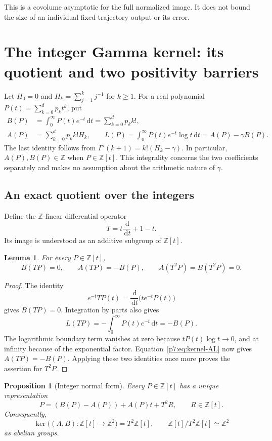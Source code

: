 \documentclass[11pt,a4paper]{article}
\newtheorem{lemma}[theorem]{Lemma}
\newtheorem{proposition}[theorem]{Proposition}
\theoremstyle{definition}
\theoremstyle{remark}
\newcommand{\Z}{\mathbb Z}
\newcommand{\dd}{\,\mathrm d}
\numberwithin{equation}{section}
\begin{document}
This is a covolume asymptotic for the full normalized image. It does not
bound the size of an individual fixed-trajectory output or its error.



\section{The integer Gamma kernel: its quotient and two positivity barriers}
\label{p7:sec:kernel}

Let $H_0=0$ and $H_k=\sum_{j=1}^k j^{-1}$ for $k\geq1$.
For a real polynomial $P(t)=\sum_{k=0}^d p_k t^k$, put
\begin{align}
 B(P)&=\int_0^\infty P(t)e^{-t}\dd t
       =\sum_{k=0}^d p_k k!,\label{p7:eq:kernel-B}\\
 A(P)&=\sum_{k=0}^d p_k k!H_k,\qquad
 L(P)=\int_0^\infty P(t)e^{-t}\log t\dd t
       =A(P)-\gamma B(P).\label{p7:eq:kernel-AL}
\end{align}
The last identity follows from
$\Gamma'(k+1)=k!(H_k-\gamma)$.
In particular, $A(P),B(P)\in\Z$ when $P\in\Z[t]$.
This integrality concerns the two coefficients separately and makes no
assumption about the arithmetic nature of $\gamma$.

\subsection{An exact quotient over the integers}

Define the $\Z$-linear differential operator
\[
 T=t\frac{\dd}{\dd t}+1-t.
\]
Its image is understood as an additive subgroup of $\Z[t]$.

\begin{lemma}\label{p7:lem:kernel-T-identities}
For every $P\in\Z[t]$,
\[
 B(TP)=0,\qquad A(TP)=-B(P),\qquad
 A(T^2P)=B(T^2P)=0.
\]
\end{lemma}

\begin{proof}
The identity
\[
 e^{-t}TP(t)=\frac{\dd}{\dd t}\bigl(te^{-t}P(t)\bigr)
\]
gives $B(TP)=0$.  Integration by parts also gives
\[
 L(TP)=-\int_0^\infty P(t)e^{-t}\dd t=-B(P).
\]
The logarithmic boundary term vanishes at zero because
$tP(t)\log t\to0$, and at infinity because of the exponential factor.
Equation~\eqref{p7:eq:kernel-AL} now gives $A(TP)=-B(P)$.
Applying these two identities once more proves the assertion for $T^2P$.
\end{proof}

\begin{proposition}[Integer normal form]\label{p7:prop:kernel-normal-form}
Every $P\in\Z[t]$ has a unique representation
\begin{equation}\label{p7:eq:kernel-normal-form}
 P=(B(P)-A(P))+A(P)t+T^2R,\qquad R\in\Z[t].
\end{equation}
Consequently,
\[
 \ker\bigl((A,B):\Z[t]\longrightarrow\Z^2\bigr)=T^2\Z[t],
 \qquad
 \Z[t]/T^2\Z[t]\simeq\Z^2
\]
as abelian groups.
\end{proposition}
\end{document}
